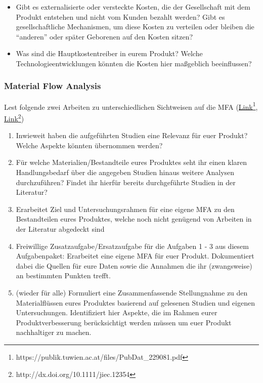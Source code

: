 \documentclass[headinclude=true]{scrartcl}
\begin{document}
\begin{itemize}
	\item Gibt es externalisierte oder versteckte Kosten, die der Gesellschaft mit dem Produkt entstehen und nicht vom Kunden bezahlt werden? Gibt es gesellschaftliche Mechanismen, um diese Kosten zu verteilen oder bleiben die "`anderen"' oder später Geborenen auf den Kosten sitzen?
	\item Was sind die Hauptkostentreiber in eurem Produkt? Welche Technologieentwicklungen könnten die Kosten hier maßgeblich beeinflussen?
\end{itemize}

\subsubsection{Material Flow Analysis}

Lest folgende zwei Arbeiten zu unterschiedlichen Sichtweisen auf die MFA (\href{https://publik.tuwien.ac.at/files/PubDat_229081.pdf}{Link\footnote{\url{https://publik.tuwien.ac.at/files/PubDat_229081.pdf}}}, \href{http://dx.doi.org/10.1111/jiec.12354}{Link\footnote{\url{http://dx.doi.org/10.1111/jiec.12354}}})

	      \begin{enumerate}
		      \item
		            Inwieweit haben die aufgeführten Studien eine Relevanz für euer Produkt? Welche Aspekte könnten übernommen werden?
		     
		      \item
		            Für welche Materialien/Bestandteile eures Produktes seht ihr einen klaren Handlungsbedarf über die angegeben Studien hinaus weitere Analysen durchzuführen? Findet ihr hierfür bereits durchgeführte Studien in der Literatur?
                \item
            	      Erarbeitet Ziel und Untersuchungsrahmen für eine eigene MFA zu den Bestandteilen eures Produktes, welche noch nicht genügend von Arbeiten in der Literatur abgedeckt sind
            	      
    	      \item
    	           Freiwillige Zusatzaufgabe/Ersatzaufgabe für die Aufgaben 1 - 3 aus diesem Aufgabenpaket: Erarbeitet eine eigene MFA für euer Produkt. Dokumentiert dabei die Quellen für eure Daten sowie die Annahmen die ihr (zwangsweise) an bestimmten Punkten trefft.
        	      
    	      \item 
    	            (wieder für alle) Formuliert eine Zusammenfassende Stellungnahme zu den Materialflüssen eures Produktes basierend auf gelesenen Studien und eigenen Untersuchungen. Identifiziert hier Aspekte, die im Rahmen eurer Produktverbesserung berücksichtigt werden müssen um euer Produkt nachhaltiger zu machen.
	      \end{enumerate}
	
\end{document}

